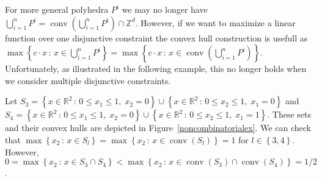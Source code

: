 \documentclass[mnsc]{informs3}
\newcommand{\set}[1]{\left\{#1\right\}}                     %
\newcommand{\bra}[1]{\left(#1\right)}
\newcommand{\Real}{\mathbb R}
\DeclareMathOperator{\conv}{conv}
\begin{document}
For more general polyhedra $P^i$ we may no longer have $\bigcup_{i=1}^n P^i=\conv\bra{\bigcup_{i=1}^n P^i}\cap \mathbb{Z}^d$. However, if we want to maximize a linear function over one disjunctive constraint the convex hull construction is usefull as $\max\set{c\cdot x\,:\, x\in \bigcup_{i=1}^n P^i}=\max\set{c\cdot x\,:\, x\in \conv\bra{\bigcup_{i=1}^n P^i}}$. Unfortunately, as illustrated in the following example, this no longer holds when we consider multiple disjunctive constraints. 
\begin{example}\label{examplemax} Let $S_3=\set{x\in \Real^2\,:\, 0\leq x_1\leq 1,\;x_2=0}\cup \set{x\in \Real^2\,:\, 0\leq x_2\leq 1,\;x_1=0}$ and $S_4=\set{x\in \Real^2\,:\, 0\leq x_1\leq 1,\;x_2=0}\cup \set{x\in \Real^2\,:\, 0\leq x_2\leq 1,\;x_1=1}$. These sets and their convex hulls are depicted in Figure~\ref{noncombinatorialex}. We can check that $\max\set{x_2\,:\, x\in S_l}=\max\set{x_2\,:\, x\in \conv\bra{S_l}}=1$ for $l\in \set{3,4}$. However, $0=\max\set{x_2\,:\, x\in S_3\cap S_4}<\max\set{x_2\,:\, x\in \conv\bra{S_3}\cap \conv\bra{S_4}}=1/2$.
\end{example}
\end{document}
